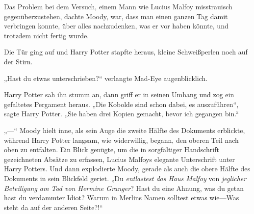 Das Problem bei dem Versuch, einem Mann wie Lucius Malfoy misstrauisch gegenüberzustehen, dachte Moody, war, dass man einen ganzen Tag damit verbringen konnte, über alles nachzudenken, was er vor haben könnte, und trotzdem nicht fertig wurde.

Die Tür ging auf und Harry Potter stapfte heraus, kleine Schweißperlen noch auf der Stirn.

„Hast du etwas unterschrieben?“ verlangte Mad-Eye augenblicklich.

Harry Potter sah ihn stumm an, dann griff er in seinen Umhang und zog ein gefaltetes Pergament heraus. „Die Kobolde sind schon dabei, es auszuführen“, sagte Harry Potter. „Sie haben drei Kopien gemacht, bevor ich gegangen bin.“

„—“
Moody hielt inne, als sein Auge die zweite Hälfte des Dokuments erblickte, während Harry Potter langsam, wie widerwillig, begann, den oberen Teil nach oben zu entfalten. Ein Blick genügte, um die in sorgfältiger Handschrift gezeichneten Absätze zu erfassen, Lucius Malfoys elegante Unterschrift unter Harry Potters. Und dann explodierte Moody, gerade als auch die obere Hälfte des Dokuments in sein Blickfeld geriet.
„Du \emph{entlastest das Haus Malfoy} von \emph{jeglicher Beteiligung am Tod von Hermine Granger}? Hast du eine Ahnung, was du getan hast du verdammter Idiot? Warum in Merlins Namen solltest etwas wie—Was steht da auf der anderen Seite?!“

